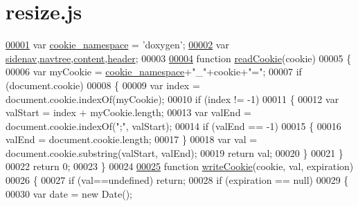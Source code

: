 \hypertarget{resize_8js_source}{\section{resize.\+js}
\label{resize_8js_source}
}

\begin{DoxyCode}
\hypertarget{resize_8js_source_l00001}{}\hyperlink{resize_8js_ab3321080c64c8797ebbcd6e30982c62c}{00001} var \hyperlink{resize_8js_ab3321080c64c8797ebbcd6e30982c62c}{cookie\_namespace} = \textcolor{stringliteral}{'doxygen'}; 
\hypertarget{resize_8js_source_l00002}{}\hyperlink{resize_8js_a9a7b07fe0df5af5957564912e842c0a4}{00002} var \hyperlink{resize_8js_a9a7b07fe0df5af5957564912e842c0a4}{sidenav},\hyperlink{resize_8js_a711d37a3374012d4f6060fffe0abea55}{navtree},\hyperlink{resize_8js_abaa405b2de1fea05ef421122098b4750}{content},\hyperlink{resize_8js_af920c2a7d4f4b5a962fe8e11257f871d}{header};
00003 
\hypertarget{resize_8js_source_l00004}{}\hyperlink{resize_8js_a578d54a5ebd9224fad0213048e7a49a7}{00004} \textcolor{keyword}{function} \hyperlink{resize_8js_a578d54a5ebd9224fad0213048e7a49a7}{readCookie}(cookie) 
00005 \{
00006   var myCookie = \hyperlink{resize_8js_ab3321080c64c8797ebbcd6e30982c62c}{cookie\_namespace}+\textcolor{stringliteral}{"\_"}+cookie+\textcolor{stringliteral}{"="};
00007   \textcolor{keywordflow}{if} (document.cookie) 
00008   \{
00009     var index = document.cookie.indexOf(myCookie);
00010     \textcolor{keywordflow}{if} (index != -1) 
00011     \{
00012       var valStart = index + myCookie.length;
00013       var valEnd = document.cookie.indexOf(\textcolor{stringliteral}{";"}, valStart);
00014       \textcolor{keywordflow}{if} (valEnd == -1) 
00015       \{
00016         valEnd = document.cookie.length;
00017       \}
00018       var val = document.cookie.substring(valStart, valEnd);
00019       \textcolor{keywordflow}{return} val;
00020     \}
00021   \}
00022   \textcolor{keywordflow}{return} 0;
00023 \}
00024 
\hypertarget{resize_8js_source_l00025}{}\hyperlink{resize_8js_ad0822459a7d442b8c5e4db795d0aabb4}{00025} \textcolor{keyword}{function} \hyperlink{resize_8js_ad0822459a7d442b8c5e4db795d0aabb4}{writeCookie}(cookie, val, expiration) 
00026 \{
00027   \textcolor{keywordflow}{if} (val==undefined) \textcolor{keywordflow}{return};
00028   \textcolor{keywordflow}{if} (expiration == null) 
00029   \{
00030     var date = \textcolor{keyword}{new} Date();

\end{DoxyCode}
